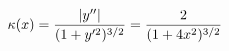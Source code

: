 \documentclass[preview]{standalone}
\begin{document}
\begin{align*}
\special{dvisvgm:raw <g id='unique000'>}\kappa(x)=\dfrac{|y''|}{(1+y'^2)^{3/2}}=\dfrac{2}{(1+4x^2)^{3/2}}\special{dvisvgm:raw </g>}
\end{align*}
\end{document}
